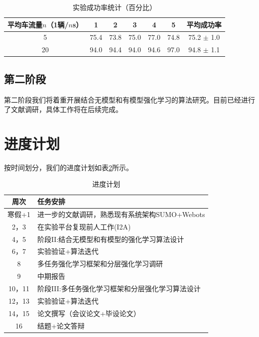 \documentclass[degree=bachelor, tocarialchapter, pifootnote]{thuthesis}
\begin{document}
  \begin{table}[h!]
  \centering
  \caption{实验成功率统计（百分比）}
  \label{table:experiment_phaseI}
  \begin{tabular}[c]{|c||c|c|c|c|c||c|}
  \hline
  \textbf{平均车流量$n$（1辆/$n$s）} & \textbf{1}& \textbf{2}& \textbf{3}& \textbf{4}& \textbf{5}& \textbf{平均成功率}\\
  \hline
  5 & 75.4 & 73.8 & 75.0 & 77.0 & 74.8 & 75.2 $\pm$ 1.0 \\ \hline
  20 & 94.0 & 94.4 & 94.0 & 94.6 & 97.0 & 94.8 $\pm$ 1.1 \\ \hline
  \end{tabular}
  \end{table}
  
  \subsection{第二阶段}
    第二阶段我们将着重开展结合无模型和有模型强化学习的算法研究。目前已经进行了文献调研，具体工作将在后续完成。

\section{进度计划}
  按时间划分，我们的进度计划如表\ref{table:plan}所示。
  \begin{table}[h!]
  \centering
  \caption{进度计划}
  \label{table:plan}
  \begin{tabular}[c]{|c||p{10cm}|}
  \hline
  \textbf{周次} & \textbf{任务安排}\\
  \hline
  寒假+1   & 进一步的文献调研，熟悉现有系统架构SUMO+Webots \\ \hline
  2，3   & 在实验平台复现前人工作(I2A\cite{I2A}) \\ \hline
  4，5   & 阶段II:结合无模型和有模型的强化学习算法设计\\ \hline
  6，7   & 实验验证+算法迭代\\ \hline
  8     & 多任务强化学习框架和分层强化学习调研\\ \hline
  9   & 中期报告\\ \hline
  10，11   & 阶段III:多任务强化学习框架和分层强化学习算法设计\\ \hline
  12，13   & 实验验证+算法迭代\\ \hline
  14，15   & 论文撰写（会议论文+毕设论文）\\ \hline
  16   & 结题+论文答辩\\
  \hline
  \end{tabular}
  \end{table}
\end{document}
